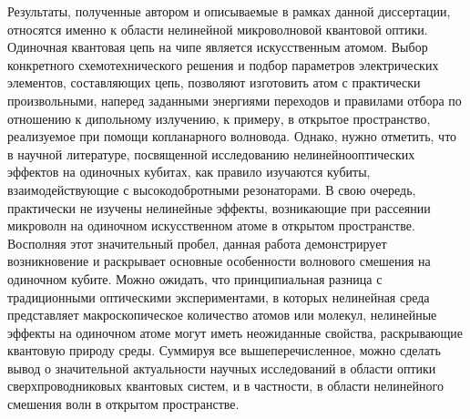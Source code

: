  Результаты, полученные автором и описываемые в рамках данной диссертации, относятся именно к области нелинейной микроволновой квантовой оптики. Одиночная квантовая цепь на чипе является искусственным атомом. Выбор конкретного схемотехнического решения и подбор параметров электрических элементов, составляющих цепь, позволяют изготовить атом с практически произвольными, наперед заданными энергиями переходов и правилами отбора по отношению к дипольному излучению, к примеру, в открытое пространство, реализуемое при помощи копланарного волновода. Однако, нужно отметить, что в научной литературе, посвященной исследованию нелинейнооптических эффектов на одиночных кубитах, как правило  изучаются кубиты, взаимодействующие с высокодобротными резонаторами. В свою очередь, практически не изучены нелинейные эффекты, возникающие при рассеянии микроволн на одиночном искусственном атоме в открытом пространстве. Восполняя этот значительный пробел, данная работа демонстрирует возникновение и раскрывает основные особенности волнового смешения на одиночном кубите. Можно ожидать, что принципиальная разница с традиционными оптическими экспериментами, в которых нелинейная среда представляет макроскопическое количество атомов или молекул, нелинейные эффекты на одиночном атоме могут иметь неожиданные свойства, раскрывающие квантовую природу среды.  Суммируя все вышеперечисленное, можно сделать вывод о значительной актуальности научных исследований в области оптики сверхпроводниковых квантовых систем, и в частности, в области нелинейного смешения волн в открытом пространстве.

